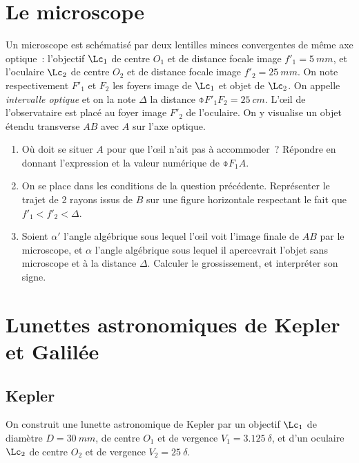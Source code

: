 \documentclass[../../main/main.tex]{subfiles}
\begin{document}
\section{Le microscope}

Un microscope est schématisé par deux lentilles minces convergentes de même axe
optique~: l'objectif $\Lc_1$ de centre $O_1$ et de distance focale image $f'_1 =
	\SI{5}{mm}$, et l'oculaire $\Lc_2$ de centre $O_2$ et de distance focale image
$f'_2 = \SI{25}{mm}$. On note respectivement $F'_1$ et $F_2$ les foyers image de
$\Lc_1$ et objet de $\Lc_2$. On appelle \textit{intervalle optique} et on la
note $\Delta$ la distance $\obar{F'_1F_2} = \SI{25}{cm}$. L'œil de
l'observataire est placé au foyer image $F'_2$ de l'oculaire. On y visualise un
objet étendu transverse $AB$ avec $A$ sur l'axe optique.

\begin{enumerate}
	\item Où doit se situer $A$ pour que l'œil n'ait pas à accommoder~? Répondre
	      en donnant l'expression et la valeur numérique de $\obar{F_1A}$.
	\item On se place dans les conditions de la question précédente. Représenter
	      le trajet de 2 rayons issus de $B$ sur une figure horizontale respectant
	      le fait que $f'_1 < f'_2 < \Delta$.
	\item Soient $\alpha'$ l'angle algébrique sous lequel l'œil voit l'image
	      finale de $AB$ par le microscope, et $\alpha$ l'angle algébrique sous
	      lequel il apercevrait l'objet sans microscope et à la distance $\Delta$.
	      Calculer le grossissement, et interpréter son signe.
\end{enumerate}

\section{Lunettes astronomiques de Kepler et Galilée}

\subsection{Kepler}

On construit une lunette astronomique de Kepler par un objectif $\Lc_1$ de
diamètre $D = \SI{30}{mm}$, de centre $O_1$ et de vergence $V_1 =
	\SI{3.125}{\delta}$, et d'un oculaire $\Lc_2$ de centre $O_2$ et de vergence
$V_2 = \SI{25}{\delta}$.
\end{document}

